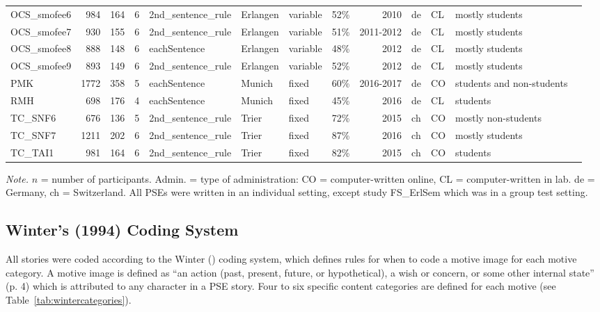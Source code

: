 \documentclass[man,a4paper,mask]{apa6}
\begin{document}
\begin{sidewaystable*}
\begin{threeparttable}
\begin{tabularx}{\textwidth}{lrrrlllrrllll}
  OCS\_smofee6 & 984 & 164 &   6 & 2nd\_sentence\_rule & Erlangen & variable & 52\% & 2010 & de & CL & mostly students \\ 
  OCS\_smofee7 & 930 & 155 &   6 & 2nd\_sentence\_rule & Erlangen & variable & 51\% & 2011-2012 & de & CL & mostly students \\ 
  OCS\_smofee8 & 888 & 148 &   6 & eachSentence & Erlangen & variable & 48\% & 2012 & de & CL & mostly students \\ 
  OCS\_smofee9 & 893 & 149 &   6 & 2nd\_sentence\_rule & Erlangen & variable & 52\% & 2012 & de & CL & mostly students \\ 
  PMK & 1772 & 358 &   5 & eachSentence & Munich & fixed & 60\% & 2016-2017 & de & CO & students and non-students \\ 
  RMH & 698 & 176 &   4 & eachSentence & Munich & fixed & 45\% & 2016 & de & CL & students \\ 
  TC\_SNF6 & 676 & 136 &   5 & 2nd\_sentence\_rule & Trier & fixed & 72\% & 2015 & ch & CO & mostly non-students \\ 
  TC\_SNF7 & 1211 & 202 &   6 & 2nd\_sentence\_rule & Trier & fixed & 87\% & 2016 & ch & CO & mostly students \\ 
  TC\_TAI1 & 981 & 164 &   6 & 2nd\_sentence\_rule & Trier & fixed & 82\% & 2015 & ch & CO & students \\ 
   \hline


		\bottomrule
		\end{tabularx}
		\begin{tablenotes}[para,flushleft]
			{\small
			\vspace*{0.75em}
			\textit{Note.} $n$ = number of participants. Admin. = type of administration: CO = computer-written online, CL = computer-written in lab. de = Germany, ch = Switzerland. All PSEs were written in an individual setting, except study FS_ErlSem which was in a group test setting.}
    \end{tablenotes}
\end{threeparttable}
\end{sidewaystable*}


\subsection{Winter's (1994) Coding System}
All stories were coded according to the Winter (\citeyear{winter_ManualScoringMotive_1994}) coding system, which defines rules for when to code a motive image for each motive category. A motive image is defined as ``an action (past, present, future, or hypothetical), a wish or concern, or some other internal state'' (p. 4) which is attributed to any character in a PSE story. Four to six specific content categories are defined for each motive (see Table~\ref{tab:wintercategories}). 
\end{document}

